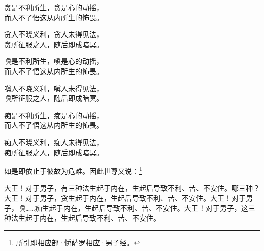 \begin{quoting}
    \begin{quoting}
        贪是不利所生，贪是心的动摇，\\
        而人不了悟这从内所生的怖畏。

        贪人不晓义利，贪人未得见法，\\
        贪所征服之人，随后即成暗冥。



        嗔是不利所生，嗔是心的动摇，\\
        而人不了悟这从内所生的怖畏。

        嗔人不晓义利，嗔人未得见法，\\
        嗔所征服之人，随后即成暗冥。



        痴是不利所生，痴是心的动摇，\\
        而人不了悟这从内所生的怖畏。

        痴人不晓义利，痴人未得见法，\\
        痴所征服之人，随后即成暗冥。


    \end{quoting}
\end{quoting}

如是即依止于彼故为危难。因此世尊又说：\footnote{所引即相应部·㤭萨罗相应·男子经。}


\begin{quoting}大王！对于男子，有三种法生起于内在，生起后导致不利、苦、不安住。哪三种？大王！对于男子，贪生起于内在，生起后导致不利、苦、不安住。大王！对于男子，嗔……痴生起于内在，生起后导致不利、苦、不安住。大王！对于男子，这三种法生起于内在，生起后导致不利、苦、不安住。\end{quoting}


